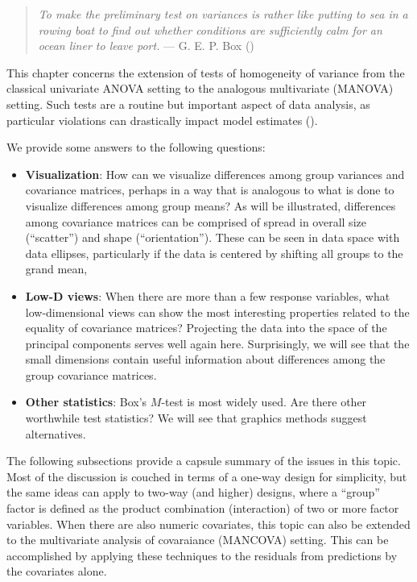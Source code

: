 \documentclass[
  letterpaper,
  10pt,
  krantz2]{krantz}
\begin{document}
\begin{quote}
\emph{To make the preliminary test on variances is rather like putting
to sea in a rowing boat to find out whether conditions are sufficiently
calm for an ocean liner to leave port.} --- G. E. P. Box
()
\end{quote}

This chapter concerns the extension of tests of homogeneity of variance
from the classical univariate ANOVA setting to the analogous
multivariate (MANOVA) setting. Such tests are a routine but important
aspect of data analysis, as particular violations can drastically impact
model estimates ().

We provide some answers to the following questions:

\begin{itemize}
\item
  \textbf{Visualization}: How can we visualize differences among group
  variances and covariance matrices, perhaps in a way that is analogous
  to what is done to visualize differences among group means? As will be
  illustrated, differences among covariance matrices can be comprised of
  spread in overall size (``scatter'') and shape (``orientation'').
  These can be seen in data space with data ellipses, particularly if
  the data is centered by shifting all groups to the grand mean,
\item
  \textbf{Low-D views}: When there are more than a few response
  variables, what low-dimensional views can show the most interesting
  properties related to the equality of covariance matrices? Projecting
  the data into the space of the principal components serves well again
  here. Surprisingly, we will see that the small dimensions contain
  useful information about differences among the group covariance
  matrices.
\item
  \textbf{Other statistics}: Box's \(M\)-test is most widely used. Are
  there other worthwhile test statistics? We will see that graphics
  methods suggest alternatives.
\end{itemize}

The following subsections provide a capsule summary of the issues in
this topic. Most of the discussion is couched in terms of a one-way
design for simplicity, but the same ideas can apply to two-way (and
higher) designs, where a ``group'' factor is defined as the product
combination (interaction) of two or more factor variables. When there
are also numeric covariates, this topic can also be extended to the
multivariate analysis of covaraiance (MANCOVA) setting. This can be
accomplished by applying these techniques to the residuals from
predictions by the covariates alone.
\end{document}
